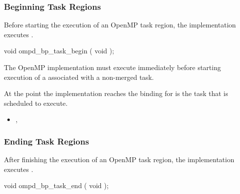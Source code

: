 \subsubsection{Beginning Task Regions}
\label{subsubsec:ompd_bp_task_begin}

\summary

Before starting the execution of an OpenMP task region, 
the implementation executes .


\format
\begin{cspecific}
\begin{ompSyntax}
void ompd_bp_task_begin ( void );
\end{ompSyntax}
\end{cspecific}


\descr

The OpenMP implementation must execute  immediately
before starting execution of a  associated 
with a non-merged task. %

At the point the implementation reaches 
the binding for 
is the task that is scheduled to execute.

\crossreferences

\begin{itemize}
\item
  , 
\end{itemize}





\subsubsection{Ending Task Regions}
\label{subsubsec:ompd_bp_task_end}

\summary

After finishing the execution of an OpenMP task region, 
the implementation executes .

\format
\begin{cspecific}
\begin{ompSyntax}
void ompd_bp_task_end ( void );
\end{ompSyntax}
\end{cspecific}


\descr

